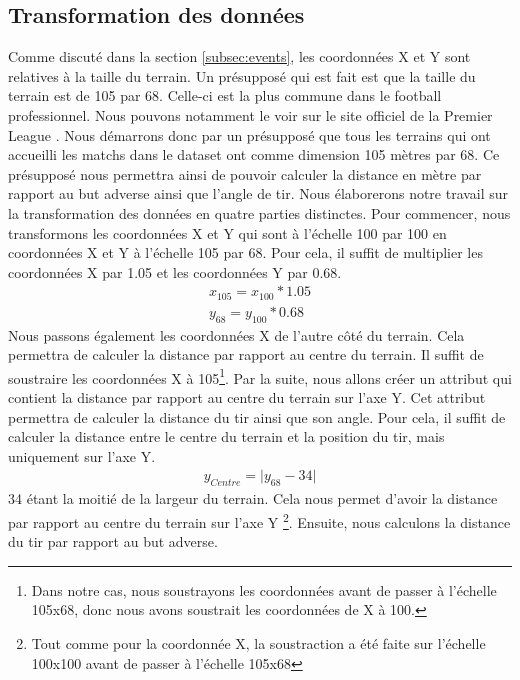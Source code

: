 \documentclass[12pt]{article}
\begin{document}
\subsection{Transformation des données}
Comme discuté dans la section \ref{subsec:events}, les coordonnées X et Y sont relatives à la taille du terrain.
Un présupposé qui est fait est que la taille du terrain est de 105 par 68.
Celle-ci est la plus commune dans le football professionnel.
Nous pouvons notamment le voir sur le site officiel de la Premier League \cite{PremierLeagueClubs}.
Nous démarrons donc par un présupposé que tous les terrains qui ont accueilli les matchs dans le dataset ont comme dimension 105 mètres par 68.
Ce présupposé nous permettra ainsi de pouvoir calculer la distance en mètre par rapport au but adverse ainsi que l'angle de tir.
\newpage
Nous élaborerons notre travail sur la transformation des données en quatre parties distinctes.
Pour commencer, nous transformons les coordonnées X et Y qui sont à l'échelle 100 par 100 en coordonnées X et Y à l'échelle 105 par 68.
Pour cela, il suffit de multiplier les coordonnées X par 1.05 et les coordonnées Y par 0.68.
\begin{equation}
    \begin{split}
        x_{105} = x_{100} * 1.05 \\
        y_{68} = y_{100} * 0.68
    \end{split}
\end{equation}
Nous passons également les coordonnées X de l'autre côté du terrain.
Cela permettra de calculer la distance par rapport au centre du terrain.
Il suffit de soustraire les coordonnées X à 105\footnote{Dans notre cas, nous soustrayons les coordonnées avant de passer à l'échelle 105x68, donc nous avons soustrait les coordonnées de X à 100.}.
\newline\newline
Par la suite, nous allons créer un attribut qui contient la distance par rapport au centre du terrain sur l'axe Y.
Cet attribut permettra de calculer la distance du tir ainsi que son angle.
Pour cela, il suffit de calculer la distance entre le centre du terrain et la position du tir, mais uniquement sur l'axe Y.
\begin{equation}
    \begin{split}
        y_{Centre} = \lvert y_{68} - 34 \rvert
    \end{split}
\end{equation}
34 étant la moitié de la largeur du terrain.
Cela nous permet d'avoir la distance par rapport au centre du terrain sur l'axe Y \footnote{Tout comme pour la coordonnée X, la soustraction a été faite sur l'échelle 100x100 avant de passer à l'échelle 105x68}.
\newline\newline
Ensuite, nous calculons la distance du tir par rapport au but adverse.
\end{document}

